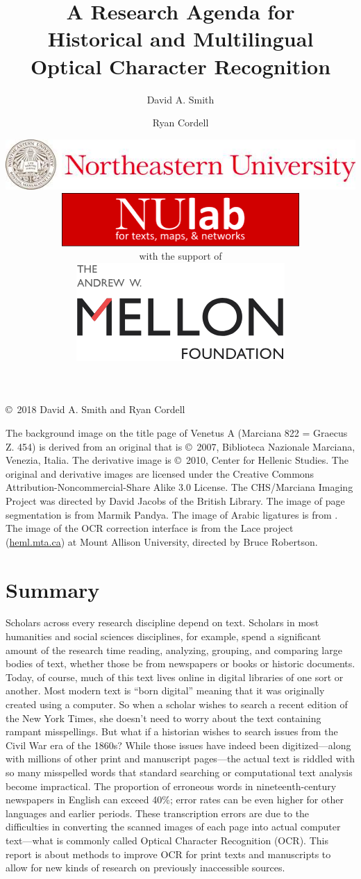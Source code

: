 \documentclass[twoside,11pt]{report}
\title{\Huge A Research Agenda for \\ Historical and Multilingual \\ Optical Character Recognition}
\author{\huge David A. Smith \and \huge Ryan Cordell}
\date{\centering \vspace{0.2in} \includegraphics[width=5.5in]{northeastern.png} \vspace{0.5in} \\
  \includegraphics{nulab.png} \\
  \vspace{0.2in} \centering \huge with the support of \\ \vspace{0.1in}
  \includegraphics{mellon.png}}
\newcommand\BackgroundPic{%
\put(0,0){%
\parbox[b][\paperheight]{\paperwidth}{%
\vfill
\centering
\texttt{[image: background8.png]}%
\vfill
}}}
\begin{document}
\AddToShipoutPicture*{\BackgroundPic}

\maketitle

\noindent \copyright\ 2018 David A. Smith and Ryan Cordell

\vspace{2em}

\noindent The background image on the title page of Venetus A (Marciana 822 = Graecus Z. 454) is derived from an original that is \copyright\ 2007, Biblioteca Nazionale Marciana, Venezia, Italia. The derivative image is \copyright\ 2010, Center for Hellenic Studies. The original and derivative images are licensed under the Creative Commons Attribution-Noncommercial-Share Alike 3.0 License. The CHS/Marciana Imaging Project was directed by David Jacobs of the British Library.  The image of page segmentation is from Marmik Pandya.  The image of Arabic ligatures is from \cite{kiessling17:_impor_new_devel_arabog_optic}.  The image of the OCR correction interface is from the Lace project (\url{heml.mta.ca}) at Mount Allison University, directed by Bruce Robertson.

\tableofcontents

\chapter{Summary}
\label{sec:summary}

Scholars across every research discipline depend on text. Scholars in most humanities and social sciences disciplines, for example, spend a significant amount of the research time reading, analyzing, grouping, and comparing large bodies of text, whether those be from newspapers or books or historic documents. Today, of course, much of this text lives online in digital libraries of one sort or another. Most modern text is ``born digital'' meaning that it was originally created using a computer. So when a scholar wishes to search a recent edition of the New York Times, she doesn't need to worry about the text containing rampant misspellings. But what if a historian wishes to search issues from the Civil War era of the 1860s? While those issues have indeed been digitized---along with millions of other print and manuscript pages---the actual text is riddled with so many misspelled words that standard searching or computational text analysis become impractical. The proportion of erroneous words in nineteenth-century newspapers in English can exceed 40\%; error rates can be even higher for other languages and earlier periods. These transcription errors are due to the difficulties in converting the scanned images of each page into actual computer text---what is commonly called Optical Character Recognition (OCR). This report is about methods to improve OCR for print texts and manuscripts to allow for new kinds of research on previously inaccessible sources.
\end{document}
